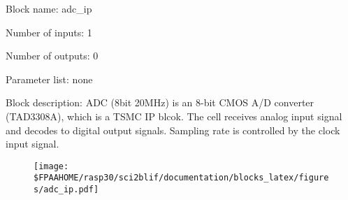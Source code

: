 \pagebreak

Block name: adc\_ip

Number of inputs: 1

Number of outputs: 0

Parameter list: none

Block description: 
ADC (8bit 20MHz) is an 8-bit CMOS A/D converter (TAD3308A), which is a TSMC IP blcok. The cell receives analog input signal and decodes to digital output signals. Sampling rate is controlled by the clock input signal.

\begin{figure}[H]  %
\texttt{[image: \$FPAAHOME/rasp30/sci2blif/documentation/blocks\_latex/figures/adc\_ip.pdf]}
\end{figure}

